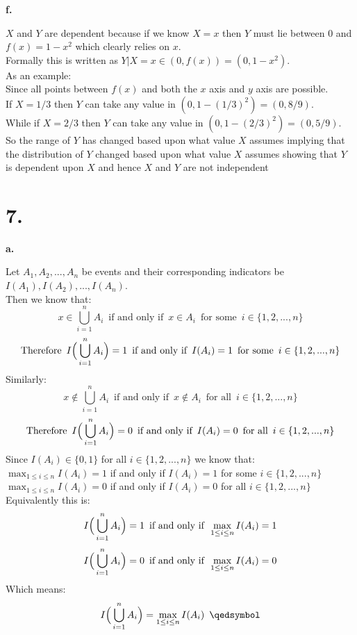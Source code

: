 \documentclass{article}
\begin{document}
\newpage
{\Large\textbf{f.}}
\begin{center}
\doublespacing
    $X$ and $Y$ are dependent because if we know $X = x$ then $Y$ must lie between 0 and $f(x) = 1 - x^2$ which clearly relies on $x$.
    \\Formally this is written as $Y | X = x\in (0, f(x)) = (0, 1 - x^2)$.
    \break
    \\As an example:
    \\Since all points between $f(x)$ and both the $x$ axis and $y$ axis are possible.
    \\If $X = 1/3$ then $Y$ can take any value in $(0,1 - (1/3)^2) = (0,8/9)$.
    \\While if $X = 2/3$ then $Y$ can take any value in $(0,1 - (2/3)^2) = (0,5/9)$.
    \break
    \\So the range of $Y$ has changed based upon what value $X$ assumes implying that the distribution of $Y$ changed based upon what value $X$ assumes showing that $Y$ is dependent upon $X$ and hence $X$ and $Y$ are not independent \qedsymbol
\end{center}


\newpage
\section*{7.}

{\Large\textbf{a.}}
\begin{center}
\doublespacing
    Let $A_1, A_2, ..., A_n$ be events and their corresponding indicators be $I(A_1), I(A_2), ..., I(A_n)$.
    \\Then we know that:
    \[x\in\bigcup _{i=1}^n A_i\;\:\mbox{if and only if}\;\:x\in A_i\;\:\mbox{for some}\;\:i\in\{1, 2, ..., n\}\]
    \[\mbox{Therefore}\;\:I\Big{(}\bigcup _{i=1}^n A_i\Big{)} = 1\;\:\mbox{if and only if}\;\:I(A_i) = 1\;\:\mbox{for some}\;\:i\in\{1, 2, ..., n\}\]
    Similarly:
    \[x\notin\bigcup _{i=1}^n A_i\;\:\mbox{if and only if}\;\:x\notin A_i\;\:\mbox{for all}\;\:i\in\{1, 2, ..., n\}\]
    \[\mbox{Therefore}\;\:I\Big{(}\bigcup _{i=1}^n A_i\Big{)} = 0\;\:\mbox{if and only if}\;\:I(A_i) = 0\;\:\mbox{for all}\;\:i\in\{1, 2, ..., n\}\]
    Since $I(A_i)\in\{0, 1\}$ for all $i\in\{1, 2, ..., n\}$ we know that:
    \\$\max_{1\leq i\leq n} I(A_i) = 1$ if and only if $I(A_i) = 1$ for some $i\in\{1, 2, ..., n\}$
    \\$\max_{1\leq i\leq n} I(A_i) = 0$ if and only if $I(A_i) = 0$ for all $i\in\{1, 2, ..., n\}$
    \break
    \\Equivalently this is:
    \[I\Big{(}\bigcup _{i=1}^n A_i\Big{)} = 1\;\:\mbox{if and only if}\;\:\max_{1\leq i\leq n} I(A_i) = 1\]
    \[I\Big{(}\bigcup _{i=1}^n A_i\Big{)} = 0\;\:\mbox{if and only if}\;\:\max_{1\leq i\leq n} I(A_i) = 0\]
    Which means:
    \[I\Big{(}\bigcup _{i=1}^n A_i\Big{)} =\max_{1\leq i\leq n} I(A_i)\;\:\qedsymbol\]
\end{center}
\end{document}
